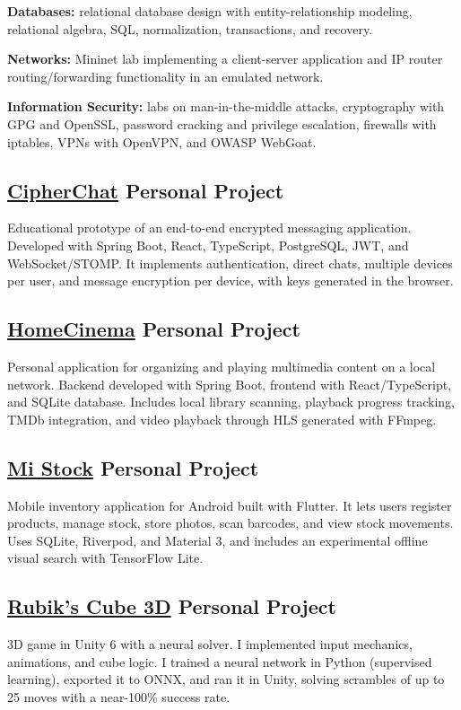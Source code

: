 \documentclass[letter,10pt]{article}
\begin{document}
\textbf{Databases:} relational database design with entity-relationship modeling, relational algebra, SQL, normalization, transactions, and recovery.

\textbf{Networks:} Mininet lab implementing a client-server application and IP router routing/forwarding functionality in an emulated network.

\textbf{Information Security:} labs on man-in-the-middle attacks, cryptography with GPG and OpenSSL, password cracking and privilege escalation, firewalls with iptables, VPNs with OpenVPN, and OWASP WebGoat.

\vspace{5mm}

\subsection{{\href{https://github.com/FacundoBacigalupi/cipher-chat}{CipherChat} \hfill Personal Project}}
Educational prototype of an end-to-end encrypted messaging application. Developed with Spring Boot, React, TypeScript, PostgreSQL, JWT, and WebSocket/STOMP. It implements authentication, direct chats, multiple devices per user, and message encryption per device, with keys generated in the browser.

\vspace{5mm}

\subsection{{\href{https://github.com/FacundoBacigalupi/home-cinema}{HomeCinema} \hfill Personal Project}}
Personal application for organizing and playing multimedia content on a local network. Backend developed with Spring Boot, frontend with React/TypeScript, and SQLite database. Includes local library scanning, playback progress tracking, TMDb integration, and video playback through HLS generated with FFmpeg.

\vspace{5mm}

\subsection{{\href{https://github.com/FacundoBacigalupi/my-stock}{Mi Stock} \hfill Personal Project}}
Mobile inventory application for Android built with Flutter. It lets users register products, manage stock, store photos, scan barcodes, and view stock movements. Uses SQLite, Riverpod, and Material 3, and includes an experimental offline visual search with TensorFlow Lite.

\vspace{5mm}

\subsection{{\href{https://github.com/FacundoBacigalupi/rubkis-cube}{Rubik's Cube 3D} \hfill Personal Project}}
3D game in Unity 6 with a neural solver. I implemented input mechanics, animations, and cube logic. I trained a neural network in Python (supervised learning), exported it to ONNX, and ran it in Unity, solving scrambles of up to 25 moves with a near-100\% success rate.
\end{document}
